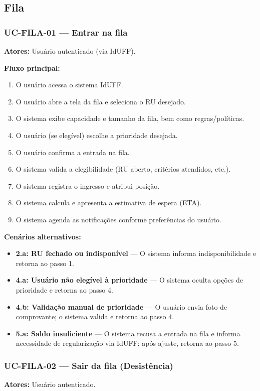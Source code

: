 \documentclass[12pt,a4paper]{article}
\begin{document}
\subsection{Fila}

\subsubsection{UC-FILA-01 — Entrar na fila}
\textbf{Atores:} Usuário autenticado (via IdUFF).  

\textbf{Fluxo principal:}
\begin{enumerate}
    \item O usuário acessa o sistema IdUFF.
    \item O usuário abre a tela da fila e seleciona o RU desejado.
    \item O sistema exibe capacidade e tamanho da fila, bem como regras/políticas.
    \item O usuário (se elegível) escolhe a prioridade desejada.
    \item O usuário confirma a entrada na fila.
    \item O sistema valida a elegibilidade (RU aberto, critérios atendidos, etc.).
    \item O sistema registra o ingresso e atribui posição.
    \item O sistema calcula e apresenta a estimativa de espera (ETA).
    \item O sistema agenda as notificações conforme preferências do usuário.
\end{enumerate}

\textbf{Cenários alternativos:}
\begin{itemize}
    \item \textbf{2.a: RU fechado ou indisponível} — O sistema informa indisponibilidade e retorna ao passo 1.
    \item \textbf{4.a: Usuário não elegível à prioridade} — O sistema oculta opções de prioridade e retorna ao passo 4.
    \item \textbf{4.b: Validação manual de prioridade} — O usuário envia foto de comprovante; o sistema valida e retorna ao passo 4.
    \item \textbf{5.a: Saldo insuficiente} — O sistema recusa a entrada na fila e informa necessidade de regularização via IdUFF; após ajuste, retorna ao passo 5.
\end{itemize}

\subsubsection{UC-FILA-02 — Sair da fila (Desistência)}
\textbf{Atores:} Usuário autenticado.  
\end{document}
